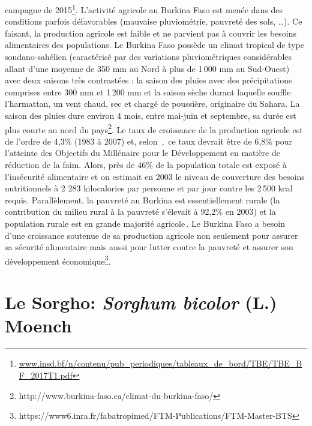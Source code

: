 \documentclass[a4paper,11pt]{article}
\begin{document}
campagne de
2015\footnote{\url{www.insd.bf/n/contenu/pub_periodiques/tableaux_de_bord/TBE/TBE_BF_2017T1.pdf}}. L’activité
agricole au Burkina Faso est menée dans des conditions parfois
défavorables (mauvaise pluviométrie, pauvreté des sols, \ldots{}). Ce
faisant, la production agricole est faible et ne parvient pas à
couvrir les besoins alimentaires des populations. Le Burkina Faso
possède un climat tropical de type soudano-sahélien (caractérisé par
des variations pluviométriques considérables allant d’une moyenne de
350 mm au Nord à plus de 1\,000 mm au Sud-Ouest) avec deux saisons
très contrastées : la saison des pluies avec des précipitations
comprises entre 300 mm et 1\,200 mm et la saison sèche durant laquelle
souffle l’harmattan, un vent chaud, sec et chargé de poussière,
originaire du Sahara. La saison des pluies dure environ 4 mois, entre
mai-juin et septembre, sa durée est plus courte au nord du
pays\footnote{http://www.burkina-faso.ca/climat-du-burkina-faso/}. Le
taux de croissance de la production agricole est de l’ordre de 4,3\%
(1983 à 2007) et, selon
\,\citeauthor{Ngaido_2006},\,\citeyear{Ngaido_2006} ce taux devrait
être de 6,8\% pour l’atteinte des Objectifs du Millénaire pour le
Développement en matière de réduction de la faim. Alors, près de 46\%
de la population totale est exposé à l’insécurité alimentaire et on
estimait en 2003 le niveau de couverture des besoins nutritionnels à 2
283 kilocalories par personne et par jour contre les 2\,500 kcal
requis. Parallèlement, la pauvreté au Burkina est essentiellement
rurale (la contribution du milieu rural à la pauvreté s’élevait à
92,2\% en 2003) et la population rurale est en grande majorité
agricole\,\cite{DPSAA_2011}. Le Burkina Faso a besoin d’une croissance
soutenue de sa production agricole non seulement pour assurer sa
sécurité alimentaire mais aussi pour lutter contre la pauvreté et
assurer son développement
économique\footnote{https://www6.inra.fr/fabatropimed/FTM-Publications/FTM-Master-BTS}.

\section{Le Sorgho: \emph{Sorghum bicolor} (L.) Moench}



\end{document}
